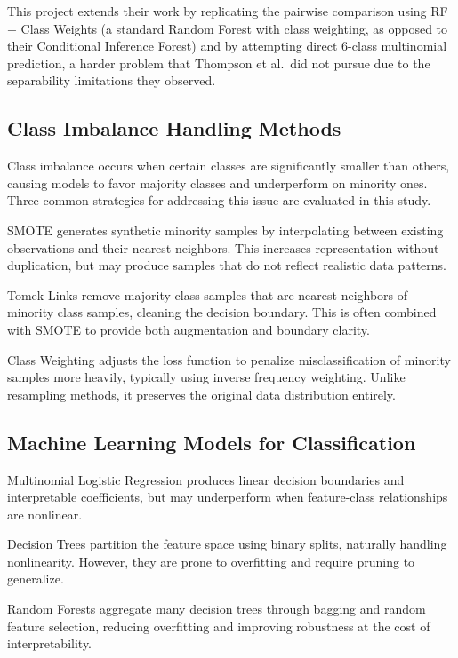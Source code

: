 \documentclass[12pt, a4paper]{article}
\begin{document}
This project extends their work by replicating the pairwise comparison using RF + Class Weights (a standard Random Forest with class weighting, as opposed to their Conditional Inference Forest) and by attempting direct 6-class multinomial prediction, a harder problem that Thompson et al.\ did not pursue due to the separability limitations they observed.

\subsection{Class Imbalance Handling Methods}

Class imbalance occurs when certain classes are significantly smaller than others,
causing models to favor majority classes and underperform on minority ones. Three
common strategies for addressing this issue are evaluated in this study.

SMOTE generates synthetic minority samples by interpolating between existing
observations and their nearest neighbors. This increases representation without
duplication, but may produce samples that do not reflect realistic data patterns.

Tomek Links remove majority class samples that are nearest neighbors of minority
class samples, cleaning the decision boundary. This is often combined with SMOTE
to provide both augmentation and boundary clarity.

Class Weighting adjusts the loss function to penalize misclassification of minority
samples more heavily, typically using inverse frequency weighting. Unlike resampling
methods, it preserves the original data distribution entirely.

\subsection{Machine Learning Models for Classification}

Multinomial Logistic Regression produces linear decision boundaries and interpretable
coefficients, but may underperform when feature-class relationships are nonlinear.

Decision Trees partition the feature space using binary splits, naturally handling
nonlinearity. However, they are prone to overfitting and require pruning to generalize.

Random Forests aggregate many decision trees through bagging and random feature
selection, reducing overfitting and improving robustness at the cost of interpretability.
\end{document}
